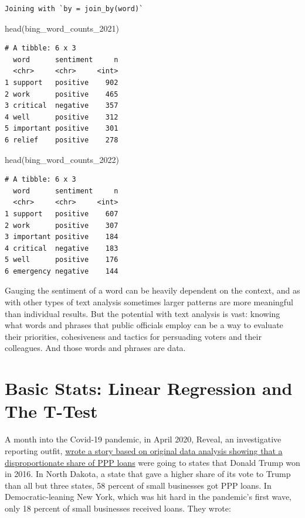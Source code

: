 \documentclass[
  letterpaper,
  DIV=11,
  numbers=noendperiod]{scrreprt}
\newenvironment{Shaded}{\begin{snugshade}}{\end{snugshade}}
\newcommand{\FunctionTok}[1]{\textcolor[rgb]{0.28,0.35,0.67}{#1}}
\newcommand{\NormalTok}[1]{\textcolor[rgb]{0.00,0.23,0.31}{#1}}
\begin{document}
\begin{verbatim}
Joining with `by = join_by(word)`
\end{verbatim}

\begin{Shaded}
\begin{Highlighting}[]
\FunctionTok{head}\NormalTok{(bing\_word\_counts\_2021)}
\end{Highlighting}
\end{Shaded}

\begin{verbatim}
# A tibble: 6 x 3
  word      sentiment     n
  <chr>     <chr>     <int>
1 support   positive    902
2 work      positive    465
3 critical  negative    357
4 well      positive    312
5 important positive    301
6 relief    positive    278
\end{verbatim}

\begin{Shaded}
\begin{Highlighting}[]
\FunctionTok{head}\NormalTok{(bing\_word\_counts\_2022)}
\end{Highlighting}
\end{Shaded}

\begin{verbatim}
# A tibble: 6 x 3
  word      sentiment     n
  <chr>     <chr>     <int>
1 support   positive    607
2 work      positive    307
3 important positive    184
4 critical  negative    183
5 well      positive    176
6 emergency negative    144
\end{verbatim}

Gauging the sentiment of a word can be heavily dependent on the context,
and as with other types of text analysis sometimes larger patterns are
more meaningful than individual results. But the potential with text
analysis is vast: knowing what words and phrases that public officials
employ can be a way to evaluate their priorities, cohesiveness and
tactics for persuading voters and their colleagues. And those words and
phrases are data.


\hypertarget{basic-stats-linear-regression-and-the-t-test}{%
\chapter{Basic Stats: Linear Regression and The
T-Test}\label{basic-stats-linear-regression-and-the-t-test}}

A month into the Covid-19 pandemic, in April 2020, Reveal, an
investigative reporting outfit,
\href{https://revealnews.org/article/bailout-money-bypasses-hard-hit-new-york-california-for-north-dakota-nebraska/}{wrote
a story based on original data analysis showing that a disproportionate
share of PPP loans} were going to states that Donald Trump won in 2016.
In North Dakota, a state that gave a higher share of its vote to Trump
than all but three states, 58 percent of small businesses got PPP loans.
In Democratic-leaning New York, which was hit hard in the pandemic's
first wave, only 18 percent of small businesses received loans. They
wrote:
\end{document}
